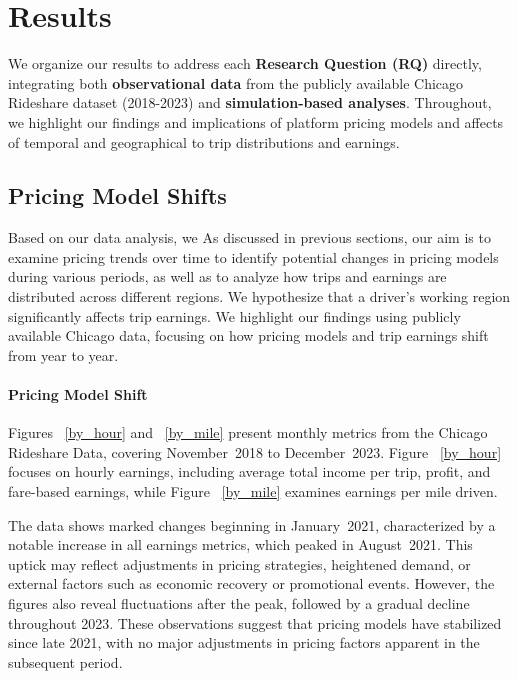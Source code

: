\section{Results}
We organize our results to address each \textbf{Research Question (RQ)} directly, integrating both \textbf{observational data} from the publicly available Chicago Rideshare dataset (2018-2023) and \textbf{simulation-based analyses}. Throughout, we highlight our findings and implications of platform pricing models and affects of temporal and geographical to trip distributions and earnings.
\subsection{Pricing Model Shifts}
Based on our data analysis, we 
As discussed in previous sections, our aim is to examine pricing trends over time to identify potential changes in pricing models during various periods, as well as to analyze how trips and earnings are distributed across different regions. We hypothesize that a driver's working region significantly affects trip earnings. We highlight our findings using publicly available Chicago data, focusing on how pricing models and trip earnings shift from year to year.

\paragraph{Pricing Model Shift}
Figures ~\ref{by_hour} and ~\ref{by_mile} present monthly metrics from the Chicago Rideshare Data, covering November~2018 to December~2023. Figure ~\ref{by_hour} focuses on hourly earnings, including average total income per trip, profit, and fare-based earnings, while Figure ~\ref{by_mile} examines earnings per mile driven.

The data shows marked changes beginning in January~2021, characterized by a notable increase in all earnings metrics, which peaked in August~2021. This uptick may reflect adjustments in pricing strategies, heightened demand, or external factors such as economic recovery or promotional events. However, the figures also reveal fluctuations after the peak, followed by a gradual decline throughout 2023. These observations suggest that pricing models have stabilized since late 2021, with no major adjustments in pricing factors apparent in the subsequent period.

